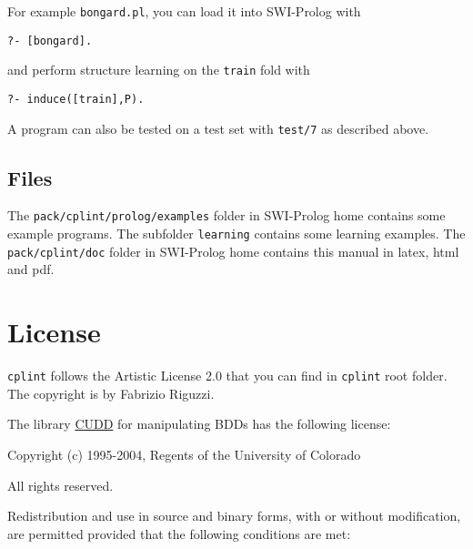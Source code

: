 \documentclass[a4paper,10pt]{article}
\begin{document}
For example \verb|bongard.pl|, you can load it into SWI-Prolog
with
\begin{verbatim}
?- [bongard].
\end{verbatim}
and perform structure learning on the \verb|train| fold with 
\begin{verbatim}
?- induce([train],P).
\end{verbatim}
A program can also be tested on a test set with \verb|test/7| as
described above.



\subsection{Files}
The \texttt{pack/cplint/prolog/examples} folder in SWI-Prolog home contains some example programs. The subfolder \texttt{learning} contains some learning examples.
The \texttt{pack/cplint/doc} folder in SWI-Prolog home contains this manual in latex, html and pdf.


\section{License}
\label{license}



\texttt{cplint} follows the Artistic License 2.0 that you can find in \texttt{cplint} root folder. The copyright is by Fabrizio Riguzzi.
\vspace{3mm}


The library \href{http://vlsi.colorado.edu/\string ~fabio/}{CUDD} for manipulating BDDs has the following license:

\vspace{3mm}

Copyright (c) 1995-2004, Regents of the University of Colorado

All rights reserved.

Redistribution and use in source and binary forms, with or without
modification, are permitted provided that the following conditions
are met:
\end{document}
